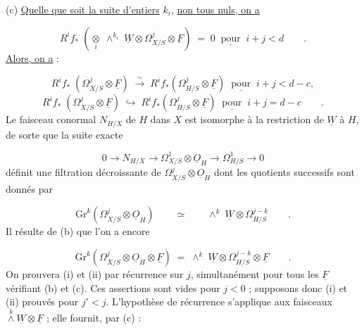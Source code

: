(c) \underline{Quelle que soit la suite d'entiers} $k_i$, \underline{non tous nuls, on a}

\begin{equation*}
R^i f_* \; (\underset{i}{\otimes} \; \wedge^{k_i} \; \underline{W} \otimes \Omega^j_{X/S} \otimes \underline{F}) \;=\; 0 \;\; \underline{\text{pour}} \;\; i+j < d \qquad .
\end{equation*}
\underline{Alors, on a} :

\begin{equation*}\tag{i}
R^i f_* \; (\Omega^j_{X/S} \otimes \underline{F}) \; \overset{\sim}{\longrightarrow} \; R^i f_*(\Omega^j_{H/S} \otimes \underline{F}) \;\; \underline{\text{pour}} \;\; i+j < d-c,
\end{equation*}
\begin{equation}\tag{ii}
R^i f_* \; (\Omega^j_{X/S} \otimes \underline{F}) \; \hookrightarrow \; R^i f_*(\Omega^j_{H/S} \otimes \underline{F}) \;\; \underline{\text{pour}} \;\; i+j = d-c \qquad .
\end{equation}
Le faisceau conormal $N_{H/X}$ de $H$ dans $X$ est isomorphe à la restriction de $\underline{W}$ à $H$, de sorte que la suite exacte

\begin{equation}\tag{1.3.1}
0 \longrightarrow N_{H/X} \longrightarrow \Omega^1_{X/S} \otimes \underline{O}_H \longrightarrow \Omega^1_{H/S} \longrightarrow 0
\end{equation}
définit une filtration décroissante de $\Omega^j_{X/S} \otimes \underline{O}_H$ dont les quotients successifs sont donnés par

\begin{equation}\tag{1.3.2}
\mathrm{Gr}^k(\Omega^j_{X/S} \otimes \underline{O}_H) \qquad \simeq \qquad \wedge^k \; \underline{W} \otimes \Omega^{j-k}_{H/S} \qquad .
\end{equation}
Il résulte de (b) que l'on a encore

\begin{equation}\tag{1.3.3}
\mathrm{Gr}^k(\Omega^j_{X/S} \otimes \underline{O}_H \otimes \underline{F}) \;=\; \wedge^k \; \underline{W} \otimes \Omega^{j-k}_{H/S} \otimes \underline{F} \qquad .
\end{equation}
On prouvera (i) et (ii) par récurrence sur $j$, simultanément pour tous les $\underline{F}$ vérifiant (b) et (c). Ces assertions sont vides pour $j < 0$ ;
supposons donc (i) et (ii) prouvés pour $j' < j$. L'hypothèse de récurrence s'applique aux faisceaux $\stackrel{k}{\wedge} \underline{W} \otimes \underline{F}$ ; elle fournit, par (c) :

